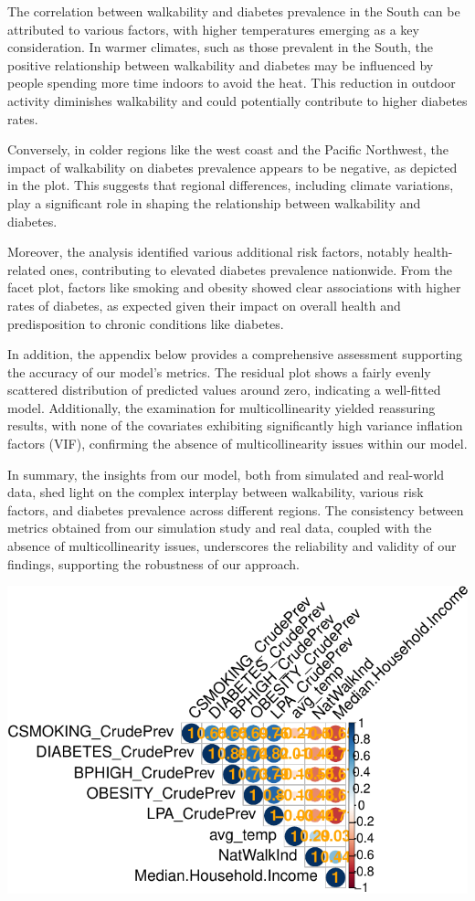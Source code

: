 \documentclass[
]{article}
\begin{document}
The correlation between walkability and diabetes prevalence in the South
can be attributed to various factors, with higher temperatures emerging
as a key consideration. In warmer climates, such as those prevalent in
the South, the positive relationship between walkability and diabetes
may be influenced by people spending more time indoors to avoid the
heat. This reduction in outdoor activity diminishes walkability and
could potentially contribute to higher diabetes rates.

Conversely, in colder regions like the west coast and the Pacific
Northwest, the impact of walkability on diabetes prevalence appears to
be negative, as depicted in the plot. This suggests that regional
differences, including climate variations, play a significant role in
shaping the relationship between walkability and diabetes.

Moreover, the analysis identified various additional risk factors,
notably health-related ones, contributing to elevated diabetes
prevalence nationwide. From the facet plot, factors like smoking and
obesity showed clear associations with higher rates of diabetes, as
expected given their impact on overall health and predisposition to
chronic conditions like diabetes.

In addition, the appendix below provides a comprehensive assessment
supporting the accuracy of our model's metrics. The residual plot shows
a fairly evenly scattered distribution of predicted values around zero,
indicating a well-fitted model. Additionally, the examination for
multicollinearity yielded reassuring results, with none of the
covariates exhibiting significantly high variance inflation factors
(VIF), confirming the absence of multicollinearity issues within our
model.

In summary, the insights from our model, both from simulated and
real-world data, shed light on the complex interplay between
walkability, various risk factors, and diabetes prevalence across
different regions. The consistency between metrics obtained from our
simulation study and real data, coupled with the absence of
multicollinearity issues, underscores the reliability and validity of
our findings, supporting the robustness of our approach.

\includegraphics{report_files/figure-pdf/unnamed-chunk-6-1.pdf}
\end{document}
